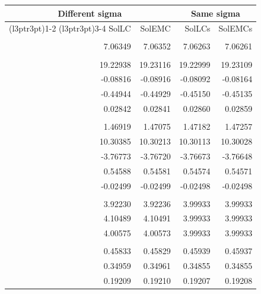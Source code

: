 \documentclass{article}\usepackage[]{graphicx}\usepackage[]{color}
\begin{document}
\begin{table}[H]
\centering
\begin{tabular}{rrrr}
\toprule
\multicolumn{2}{c}{Different sigma} & \multicolumn{2}{c}{Same sigma} \\
\cmidrule(l{3pt}r{3pt}){1-2} \cmidrule(l{3pt}r{3pt}){3-4}
SolLC & SolEMC & SolLCs & SolEMCs\\
\midrule
\addlinespace[0.3em]
\multicolumn{4}{l}{\textbf{Beta 1}}\\
\hspace{1em}7.06349 & 7.06352 & 7.06263 & 7.06261\\
\addlinespace[0.3em]
\multicolumn{4}{l}{\textbf{Beta 2}}\\
\hspace{1em}19.22938 & 19.23116 & 19.22999 & 19.23109\\
\hspace{1em}-0.08816 & -0.08916 & -0.08092 & -0.08164\\
\hspace{1em}-0.44944 & -0.44929 & -0.45150 & -0.45135\\
\hspace{1em}0.02842 & 0.02841 & 0.02860 & 0.02859\\
\addlinespace[0.3em]
\multicolumn{4}{l}{\textbf{Beta 3}}\\
\hspace{1em}1.46919 & 1.47075 & 1.47182 & 1.47257\\
\hspace{1em}10.30385 & 10.30213 & 10.30113 & 10.30028\\
\hspace{1em}-3.76773 & -3.76720 & -3.76673 & -3.76648\\
\hspace{1em}0.54588 & 0.54581 & 0.54574 & 0.54571\\
\hspace{1em}-0.02499 & -0.02499 & -0.02498 & -0.02498\\
\addlinespace[0.3em]
\multicolumn{4}{l}{\textbf{Sigma}}\\
\hspace{1em}3.92230 & 3.92236 & 3.99933 & 3.99933\\
\hspace{1em}4.10489 & 4.10491 & 3.99933 & 3.99933\\
\hspace{1em}4.00575 & 4.00573 & 3.99933 & 3.99933\\
\addlinespace[0.3em]
\multicolumn{4}{l}{\textbf{Pi}}\\
\hspace{1em}0.45833 & 0.45829 & 0.45939 & 0.45937\\
\hspace{1em}0.34959 & 0.34961 & 0.34855 & 0.34855\\
\hspace{1em}0.19209 & 0.19210 & 0.19207 & 0.19208\\
\bottomrule
\end{tabular}
\end{table}
\end{document}
